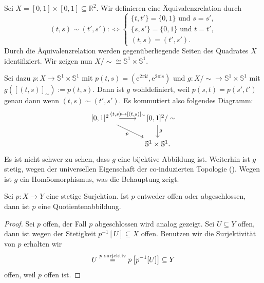 \documentclass[
12pt, 
openany, 
a4paper, 
final,
fleqn, 
]{myclass}
\numberwithin{equation}{chapter}
\numberwithin{section}{chapter}
\newcommand{\Ss}{\mathbb S}
\begin{document}
\begin{eg}\label{4.15}
Sei $ X=[0,1]\times [0,1] \subseteq \mathbb{R}^2 $. Wir definieren eine Äquivalenzrelation durch 
\[
(t, s) \sim (t', s') :\iff 
\begin{cases}
\{t, t'\}= \{0, 1\} \text{ und }s=s', \\
\{s, s'\}= \{0, 1\} \text{ und }t=t', \\
(t,s)=(t', s').
\end{cases}
\]
Durch die Äquivalenzrelation werden gegenüberliegende Seiten des Quadrates $ X $ identifiziert. Wir zeigen nun $ X/\sim \cong \mathbb{S}^{1}\times \mathbb{S}^{1} $. 

Sei dazu $ p: X \to  \mathbb{S}^{1}\times \mathbb{S}^{1} $ mit $ p(t, s) = (\mathrm{e}^{2\pi\mathrm{i} t}, \mathrm{e}^{2\pi\mathrm{i}s}) $ und $g: X/\sim\to \mathbb{S}^{1}\times \mathbb{S}^{1}$ mit $ g([(t, s)]_{\sim}) := p(t, s)$. Dann ist $g$ wohldefiniert, weil $p(s, t)=p(s', t')$ genau dann wenn $(t, s) \sim (t', s')  $. Es kommutiert also folgendes Diagramm:
\[
\begin{tikzcd}
{[0,1]^{2}} \quad \arrow{r}{(t, s)\mapsto [(t, s)]_{\sim}} \arrow[swap]{dr}{p} & \quad {[0,1]^{2}/\sim} \arrow{d}{g} \\
& \Ss^1\times \Ss^1.
\end{tikzcd}
\]
Es ist nicht schwer zu sehen, dass $ g $ eine bijektive Abbildung ist. Weiterhin ist $g$ stetig, wegen der universellen Eigenschaft der co-induzierten Topologie (). Wegen  ist $g$ ein Homöomorphismus, was die Behauptung zeigt. 
\end{eg}

\begin{thr}\label{4.16}
Sei $ p: X\to Y $ eine stetige Surjektion. Ist $ p $ entweder offen oder abgeschlossen, dann ist $ p $ eine Quotientenabbildung. 
\end{thr}
\begin{proof}
Sei $ p $ offen, der Fall $ p $ abgeschlossen wird analog gezeigt. Sei $ U\subseteq Y $ offen, dann ist wegen der Stetigkeit $ p^{-1}[U]\subseteq X $ offen. Benutzen wir die Surjektivität von $ p $ erhalten wir
\[
U \overset{\text{$ p $ surjektiv}}{=} p\left[p^{-1}[U]\right]\subseteq Y
\]
offen, weil $ p $ offen ist. 
\end{proof}
\end{document}

